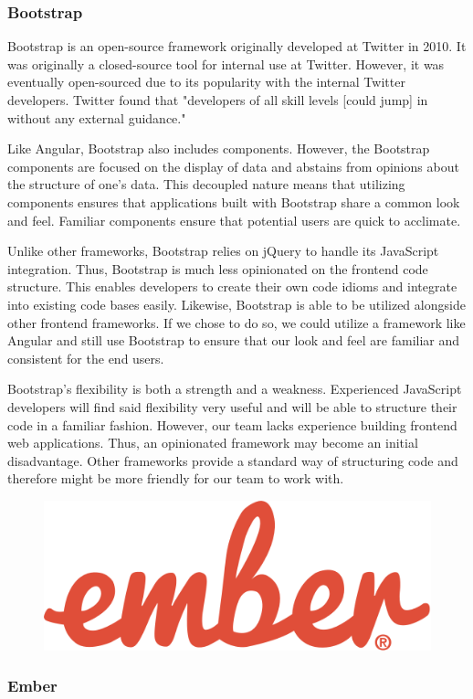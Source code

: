 \documentclass[12pt]{report}
\begin{document}
\subsubsection*{Bootstrap}

Bootstrap is an open-source framework originally developed at Twitter in 2010.\cite{bootstrapabout} It was originally a closed-source tool for internal use at Twitter. However, it was eventually open-sourced due to its popularity with the internal Twitter developers. Twitter found that "developers of all skill levels [could jump] in without any external guidance."\cite{bootstrapabout}

Like Angular, Bootstrap also includes components. However, the Bootstrap components are focused on the display of data and abstains from opinions about the structure of one's data. This decoupled nature means that utilizing components ensures that applications built with Bootstrap share a common look and feel. Familiar components ensure that potential users are quick to acclimate.

Unlike other frameworks, Bootstrap relies on jQuery to handle its JavaScript integration.\cite{bootstrapjs} Thus, Bootstrap is much less opinionated on the frontend code structure. This enables developers to create their own code idioms and integrate into existing code bases easily. Likewise, Bootstrap is able to be utilized alongside other frontend frameworks. If we chose to do so, we could utilize a framework like Angular and still use Bootstrap to ensure that our look and feel are familiar and consistent for the end users.

Bootstrap's flexibility is both a strength and a weakness. Experienced JavaScript developers will find said flexibility very useful and will be able to structure their code in a familiar fashion. However, our team lacks experience building frontend web applications. Thus, an opinionated framework may become an initial disadvantage. Other frameworks provide a standard way of structuring code and therefore might be more friendly for our team to work with.

\begin{figure}[h]
	\centering
	\includegraphics[width=0.25\linewidth]{ember}
\end{figure}

\subsubsection*{Ember}
\end{document}
